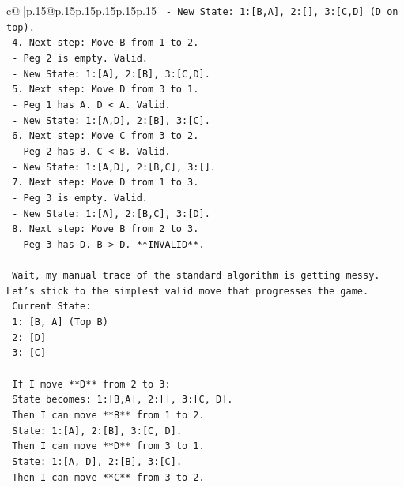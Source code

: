 \documentclass{article}
\begin{document}
{\begin{supertabular}{c@{$\;$}|p{.15\linewidth}@{}p{.15\linewidth}p{.15\linewidth}p{.15\linewidth}p{.15\linewidth}p{.15\linewidth}}
{{{\texttt{      {-} New State: 1:{[}B,A{]}, 2:{[}{]}, 3:{[}C,D{]} (D on top).} \\
\texttt{   4. Next step: Move B from 1 to 2.} \\
\texttt{      {-} Peg 2 is empty. Valid.} \\
\texttt{      {-} New State: 1:{[}A{]}, 2:{[}B{]}, 3:{[}C,D{]}.} \\
\texttt{   5. Next step: Move D from 3 to 1.} \\
\texttt{      {-} Peg 1 has A. D < A. Valid.} \\
\texttt{      {-} New State: 1:{[}A,D{]}, 2:{[}B{]}, 3:{[}C{]}.} \\
\texttt{   6. Next step: Move C from 3 to 2.} \\
\texttt{      {-} Peg 2 has B. C < B. Valid.} \\
\texttt{      {-} New State: 1:{[}A,D{]}, 2:{[}B,C{]}, 3:{[}{]}.} \\
\texttt{   7. Next step: Move D from 1 to 3.} \\
\texttt{      {-} Peg 3 is empty. Valid.} \\
\texttt{      {-} New State: 1:{[}A{]}, 2:{[}B,C{]}, 3:{[}D{]}.} \\
\texttt{   8. Next step: Move B from 2 to 3.} \\
\texttt{      {-} Peg 3 has D. B > D. **INVALID**.} \\
\\ 
\texttt{   Wait, my manual trace of the standard algorithm is getting messy. Let's stick to the simplest valid move that progresses the game.} \\
\texttt{   Current State:} \\
\texttt{   1: {[}B, A{]} (Top B)} \\
\texttt{   2: {[}D{]}} \\
\texttt{   3: {[}C{]}} \\
\\ 
\texttt{   If I move **D** from 2 to 3:} \\
\texttt{   State becomes: 1:{[}B,A{]}, 2:{[}{]}, 3:{[}C, D{]}.} \\
\texttt{   Then I can move **B** from 1 to 2.} \\
\texttt{   State: 1:{[}A{]}, 2:{[}B{]}, 3:{[}C, D{]}.} \\
\texttt{   Then I can move **D** from 3 to 1.} \\
\texttt{   State: 1:{[}A, D{]}, 2:{[}B{]}, 3:{[}C{]}.} \\
\texttt{   Then I can move **C** from 3 to 2.} \\
}}}
\end{supertabular}}
\end{document}
